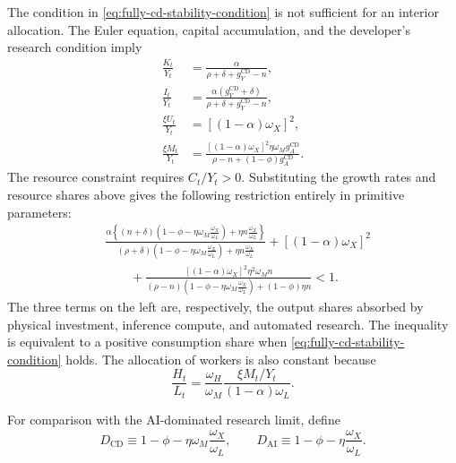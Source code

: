 The condition in \eqref{eq:fully-cd-stability-condition} is not sufficient for an
interior allocation. The Euler equation, capital accumulation, and the developer's
research condition imply
\begin{align}
    \frac{K_t}{Y_t}
    &=
    \frac{\alpha}{\rho+\delta+g_Y^{\mathrm{CD}}-n},
    \label{eq:fully-cd-capital-output}\\
    \frac{I_t}{Y_t}
    &=
    \frac{\alpha(g_Y^{\mathrm{CD}}+\delta)}
    {\rho+\delta+g_Y^{\mathrm{CD}}-n},
    \label{eq:fully-cd-investment-share}\\
    \frac{\xi U_t}{Y_t}
    &=
    [(1-\alpha)\omega_X]^2,
    \label{eq:fully-cd-inference-share}\\
    \frac{\xi M_t}{Y_t}
    &=
    \frac{[(1-\alpha)\omega_X]^2\eta\omega_M g_A^{\mathrm{CD}}}
    {\rho-n+(1-\phi)g_A^{\mathrm{CD}}}.
    \label{eq:full-cd-research-resource-share}
\end{align}
The resource constraint requires $C_t/Y_t>0$. Substituting the growth rates and
resource shares above gives the following restriction entirely in primitive
parameters:
\begin{equation}
\begin{aligned}
&\frac{\alpha\left\{(n+\delta)
    \left(1-\phi-\eta\omega_M\frac{\omega_X}{\omega_L}\right)
    +\eta n\frac{\omega_X}{\omega_L}\right\}}
{(\rho+\delta)
    \left(1-\phi-\eta\omega_M\frac{\omega_X}{\omega_L}\right)
    +\eta n\frac{\omega_X}{\omega_L}}
+[(1-\alpha)\omega_X]^2
\\
&\qquad
+\frac{[(1-\alpha)\omega_X]^2\eta^2\omega_M n}
{(\rho-n)
    \left(1-\phi-\eta\omega_M\frac{\omega_X}{\omega_L}\right)
    +(1-\phi)\eta n}
<1.
\end{aligned}
\label{eq:fully-cd-consumption-feasibility}
\end{equation}
The three terms on the left are, respectively, the output shares absorbed by
physical investment, inference compute, and automated research. The inequality is
equivalent to a positive consumption share when
\eqref{eq:fully-cd-stability-condition} holds. The allocation of workers is also
constant because
\begin{equation}
    \frac{H_t}{L_t}
    =
    \frac{\omega_H}{\omega_M}
    \frac{\xi M_t/Y_t}{(1-\alpha)\omega_L}.
    \label{eq:fully-cd-labor-allocation}
\end{equation}

For comparison with the AI-dominated research limit, define
\begin{equation}
    D_{\mathrm{CD}}
    \equiv
    1-\phi-\eta\omega_M\frac{\omega_X}{\omega_L},
    \qquad
    D_{\mathrm{AI}}
    \equiv
    1-\phi-\eta\frac{\omega_X}{\omega_L}.
    \label{eq:growth-feedback-denominators}
\end{equation}

